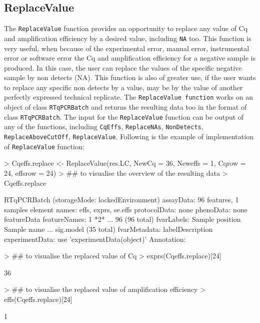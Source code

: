 \documentclass[11pt]{article}
\newcommand{\code}[1]{{\tt #1}}
\begin{document}
\subsection{ReplaceValue} 

The \code{ReplaceValue} function provides an opportunity to replace any value of Cq and amplification efficiency by a desired value, including \code{NA} too. This function is very useful, when because of the experimental error, manual error, instrumental error or software error the Cq and amplification efficiency for a negative sample is produced. In this case, the user can replace the values of the specific negative sample by non detects (NA). This function is also of greater use, if the user wants to replace any specific non detects by a value, may be by the value of another perfectly expressed technical replicate. The \code{ReplaceValue function} works on an object of class \code{RTqPCRBatch} and returns the resulting data too in the format of class \code{RTqPCRBatch}. The input for the \code{ReplaceValue} function can be output of any of the functions, including \code{CqEffs}, \code{ReplaceNAs}, \code{NonDetects}, \code{ReplaceAboveCutOff}, \code{ReplaceValue}. Following is the example of implementation of \code{ReplaceValue} function:

\begin{Schunk}
\begin{Sinput}
> Cqeffs.replace <- ReplaceValue(res.LC, NewCq = 36, Neweffs = 1, Cqrow = 24, effsrow = 24)
> ## to visualise the overview of the resulting data
> Cqeffs.replace 
\end{Sinput}
\begin{Soutput}
RTqPCRBatch (storageMode: lockedEnvironment)
assayData: 96 features, 1 samples 
  element names: effs, exprs, se.effs 
protocolData: none
phenoData: none
featureData
  featureNames: 1 *2* ... 96 (96 total)
  fvarLabels: Sample position Sample name ... sig.model (35 total)
  fvarMetadata: labelDescription
experimentData: use 'experimentData(object)'
Annotation:  
\end{Soutput}
\begin{Sinput}
> ## to visualise the replaced value of Cq
> exprs(Cqeffs.replace)[24]
\end{Sinput}
\begin{Soutput}
[1] 36
\end{Soutput}
\begin{Sinput}
> ## to visualise the replaced value of amplification efficiency
> effs(Cqeffs.replace)[24] 
\end{Sinput}
\begin{Soutput}
[1] 1
\end{Soutput}
\end{Schunk}
\end{document}
